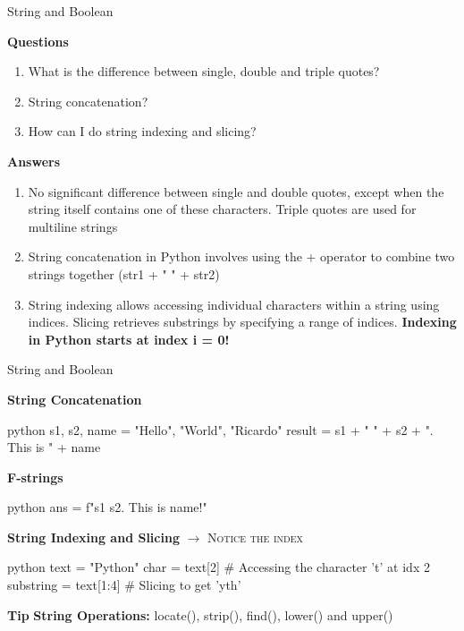\documentclass[
	11pt, 
]{beamer}
\begin{document}

\begin{frame}{String and Boolean}

\begin{block}{\textbf{Questions}}
\begin{enumerate}
    \item What is the difference between single, double and triple quotes?
    \item String concatenation?
    \item How can I do string indexing and slicing?
\end{enumerate}
\end{block}

\pause

\textbf{Answers}
\begin{enumerate}
    \item No significant difference between single and double quotes, except when the string itself contains one of these characters. Triple quotes are used for multiline strings
    \item String concatenation in Python involves using the + operator to combine two strings together (str1 + " " + str2)
    \item String indexing allows accessing individual characters within a string using indices. Slicing retrieves substrings by specifying a range of indices. \textbf{Indexing in Python starts at index i = 0!}
\end{enumerate}
    
\end{frame}



\begin{frame}[fragile]{String and Boolean}
\small %
 
\textbf{String Concatenation}   
\begin{mintedbox}{python}
s1, s2, name = "Hello", "World", "Ricardo"
result = s1 + " " + s2 + ". This is " + name 
\end{mintedbox}

\textbf{F-strings}   
\begin{mintedbox}{python}
ans = f"{s1} {s2}. This is {name}!"
\end{mintedbox}

\textbf{String Indexing and Slicing}
\hfill \textsc{$\rightarrow$ Notice the index}

\begin{mintedbox}{python}
text = "Python"
char = text[2] # Accessing the character 't' at idx 2
substring = text[1:4]  # Slicing to get 'yth'
\end{mintedbox}


\begin{exampleblock}{\textbf{Tip}}
    \textbf{String Operations:} locate(), strip(), find(), lower() and upper()
\end{exampleblock}

\end{frame}
\end{document}
